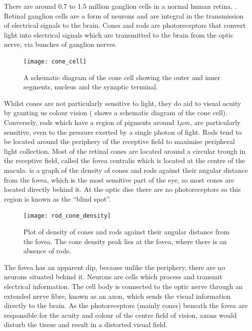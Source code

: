 There are around 0.7 to 1.5 million ganglion cells in a normal human retina.
\cite{curcio1990topography}. Retinal ganglion cells are a form of neurons
and are integral in the transmission of electrical signals to the brain.
\cite{meyer1995characterization} Cones and rods are photoreceptors
that convert light into electrical signals which are transmitted to the
brain from the optic nerve, via bunches of ganglion nerves.

\begin{figure}[!htbp]
\centering
  \texttt{[image: cone\_cell]}
\caption{A schematic diagram of the cone cell showing the outer and inner
segments, nucleus and the synaptic terminal.\cite{wikicone}}
\label{fig:cone}
\end{figure}

Whilst cones are not particularly sensitive to light, they do aid to visual
acuity by granting us colour vision ( shows a schematic
diagram of the cone cell).\cite{bowmaker1980visual} Conversely, rods
which have a region of pigments around $1\mu{m}$, are particularly
sensitive, even to the pressure exerted by a single photon of light. Rods
tend to be located around the periphery of the receptive field to maximise
peripheral light collection.\cite{liebman1964sensitive,baylor1979responses}
Most of the retinal cones are located around a circular trough in the receptive
field, called the fovea centralis which is located at the centre of the macula.
\cite{hendrickson1994primate}
 is a graph of the density of cones and rods against
their angular distance from the fovea, which is the most sensitive part of
the eye, so most cones are located directly behind it. At the optic disc there
are no photoreceptors so this region is known as the \enquote{blind spot}.

\begin{figure}[!htbp]
\centering
  \texttt{[image: rod\_cone\_density]}
\caption{Plot of density of cones and rods against their angular distance from
the fovea. The cone density peak lies at the fovea, where there is an absence
of rods.}
\label{fig:rod_cone_density}
\end{figure}

The fovea has an apparent dip, because unlike the periphery, there are
no neurons situated behind it. Neurons are cells which process and
transmit electrical information. The cell body is connected to the optic
nerve through an extended nerve fibre, known as an axon, which sends
the visual information directly to the brain. As the photoreceptors (mainly
cones) beneath the fovea are responsible for the acuity and colour of the
centre field of vision, axons would disturb the tissue and result in a
distorted visual field.

